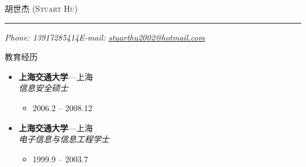 \documentclass[11pt,oneside]{article}
\makeatletter
\newcommand{\name}{胡世杰 (Stuart Hu)}
\newcommand{\phone}{Phone: 13917285414}
\newcommand{\email}{E-mail: \href{mailto:stuarthu2002@hotmail.com}{stuarthu2002@hotmail.com}}
\newcommand{\bigname}[1]{
	\begin{center}\selectfont\Huge\scshape#1\end{center}
}
\newenvironment{ressection}[1]{
	\vspace{4pt}
	{\selectfont\Large#1}
	\begin{itemize}
	\vspace{3pt}
}{
	\end{itemize}
}
\newcommand{\ressubitem}[1]{
	\vspace{-1pt}
	\item \begin{flushleft} #1 \end{flushleft}
}
\newcommand{\resbigitem}[3]{
	\vspace{-5pt}
	\item
	\textbf{#1}---#2 \\
	\textit{#3}
}
\newenvironment{ressubsec}[3]{
	\resbigitem{#1}{#2}{#3}
	\vspace{-2pt}
	\begin{itemize}
}{
    \end{itemize}
}
\makeatother
\begin{document}
\bigname{\name}

\vspace{-8pt} \rule{\textwidth}{1pt}

\vspace{-1pt} {\small\itshape \phone \hfill \email}

\vspace{8 pt}


\begin{ressection}{教育经历}

	\begin{ressubsec}{上海交通大学}{上海}{信息安全硕士}
		\ressubitem{2006.2 -- 2008.12}
	\end{ressubsec}

	\begin{ressubsec}{上海交通大学}{上海}{电子信息与信息工程学士}
		\ressubitem{1999.9 -- 2003.7}
	\end{ressubsec}

\end{ressection}
\end{document}
